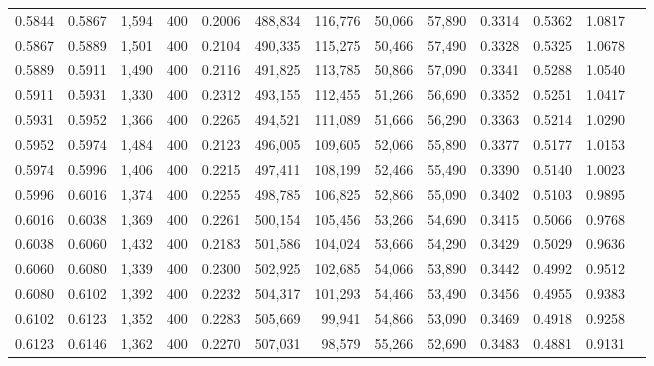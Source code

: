\begin{tabular}{rrrrrrrrrrrrr}
0.5844 & 0.5867 &  1,594 & 400 &                                     0.2006 & 488,834 & 116,776 &  50,066 &  57,890 & 0.3314 & 0.5362 & 1.0817 \\
0.5867 & 0.5889 &  1,501 & 400 &                                     0.2104 & 490,335 & 115,275 &  50,466 &  57,490 & 0.3328 & 0.5325 & 1.0678 \\
0.5889 & 0.5911 &  1,490 & 400 &                                     0.2116 & 491,825 & 113,785 &  50,866 &  57,090 & 0.3341 & 0.5288 & 1.0540 \\
0.5911 & 0.5931 &  1,330 & 400 &                                     0.2312 & 493,155 & 112,455 &  51,266 &  56,690 & 0.3352 & 0.5251 & 1.0417 \\
0.5931 & 0.5952 &  1,366 & 400 &                                     0.2265 & 494,521 & 111,089 &  51,666 &  56,290 & 0.3363 & 0.5214 & 1.0290 \\
0.5952 & 0.5974 &  1,484 & 400 &                                     0.2123 & 496,005 & 109,605 &  52,066 &  55,890 & 0.3377 & 0.5177 & 1.0153 \\
0.5974 & 0.5996 &  1,406 & 400 &                                     0.2215 & 497,411 & 108,199 &  52,466 &  55,490 & 0.3390 & 0.5140 & 1.0023 \\
0.5996 & 0.6016 &  1,374 & 400 &                                     0.2255 & 498,785 & 106,825 &  52,866 &  55,090 & 0.3402 & 0.5103 & 0.9895 \\
0.6016 & 0.6038 &  1,369 & 400 &                                     0.2261 & 500,154 & 105,456 &  53,266 &  54,690 & 0.3415 & 0.5066 & 0.9768 \\
0.6038 & 0.6060 &  1,432 & 400 &                                     0.2183 & 501,586 & 104,024 &  53,666 &  54,290 & 0.3429 & 0.5029 & 0.9636 \\
0.6060 & 0.6080 &  1,339 & 400 &                                     0.2300 & 502,925 & 102,685 &  54,066 &  53,890 & 0.3442 & 0.4992 & 0.9512 \\
0.6080 & 0.6102 &  1,392 & 400 &                                     0.2232 & 504,317 & 101,293 &  54,466 &  53,490 & 0.3456 & 0.4955 & 0.9383 \\
0.6102 & 0.6123 &  1,352 & 400 &                                     0.2283 & 505,669 &  99,941 &  54,866 &  53,090 & 0.3469 & 0.4918 & 0.9258 \\
0.6123 & 0.6146 &  1,362 & 400 &                                     0.2270 & 507,031 &  98,579 &  55,266 &  52,690 & 0.3483 & 0.4881 & 0.9131 \\

\end{tabular}
